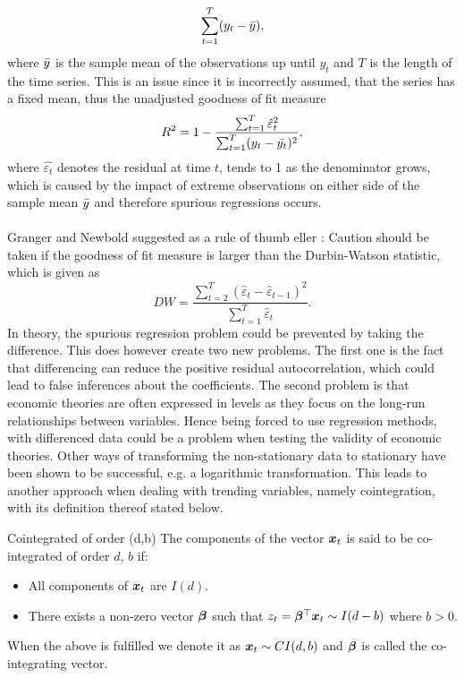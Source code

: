 \begin{equation*}
    \sum_{t=1}^T(y_t-\Bar{y}),
\end{equation*}
where $\Bar{y}$ is the sample mean of the observations up until $y_t$ and $T$ is the length of the time series. This is an issue since it is incorrectly assumed, that the series has a fixed mean, thus the unadjusted goodness of fit measure 
\begin{equation*}
    R^2=1-\frac{\sum_{t=1}^T\hat{\varepsilon}^2_t}{\sum_{t=1}^T(y_t-\Bar{y_t})^2},
\end{equation*}
where $\hat{\varepsilon_t}$ denotes the residual at time $t$, tends to 1 as the denominator grows, which is caused by the impact of extreme observations on either side of the sample mean $\Bar{y}$ and therefore spurious regressions occurs. \\\\
\noindent Granger and Newbold suggested as a rule of thumb \cite{Analysis_of_integrated_and_cointegrated_time_series_with_R} eller \cite{Spurious_Regressions_in_Econonmetrics_1974}: Caution should be taken if the goodness of fit measure is larger than the Durbin-Watson statistic, which is given as
\begin{equation*}
    DW=\frac{\sum_{t=2}^T(\hat{\varepsilon}_t-\hat{\varepsilon}_{t-1})^2}{\sum_{t=1}^T\hat{\varepsilon}_t}.
\end{equation*}
In theory, the spurious regression problem could be prevented by taking the difference. This does however create two new problems. The first one is the fact that differencing can reduce the positive residual autocorrelation, which could lead to false inferences about the coefficients. The second problem is that economic theories are often expressed in levels as they focus on the long-run relationships between variables. Hence being forced to use regression methods, with differenced data could be a problem when testing the validity of economic theories. Other ways of transforming the non-stationary data to stationary have been shown to be successful, e.g. a logarithmic transformation.
This leads to another approach when dealing with trending variables, namely cointegration, with its definition thereof stated below.

\begin{defi}{Cointegrated of order (d,b)}
    The components of the vector $\boldsymbol{x}_t$ is said to be co-integrated of order $d$, $b$ if:
    \begin{itemize}
        \item All components of $\boldsymbol{x}_t$ are $I(d)$.
        \item There exists a non-zero vector $\boldsymbol{\beta}$ such that $z_t=\boldsymbol{\beta}^\top \boldsymbol{x}_t\sim I(d-b)$ where $b>0$.
    \end{itemize}
    When the above is fulfilled we denote it as $\boldsymbol{x}_t\sim CI(d,b)$ and $\boldsymbol{\beta}$ is called the co-integrating vector.
    \label{Def:Co-integrated of order d,b}
\end{defi}
 

